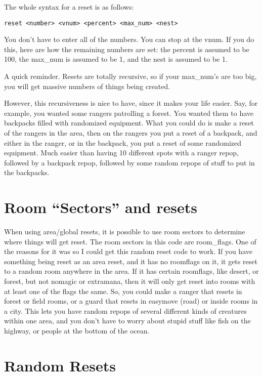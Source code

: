 The whole syntax for a reset is as follows:

\begin{verbatim}
reset <number> <vnum> <percent> <max_num> <nest>
\end{verbatim}

You don't have to enter all of the numbers. You can stop at the
vnum. If you do this, here are how the remaining numbers are set:
 the percent is assumed to be 100, the max\_num
is assumed to be 1, and the nest is assumed to be 1. 

A quick reminder. Resets are totally recursive, so if your max\_num's
are too big, you will get massive numbers of things being created.

However, this recursiveness is nice to have, since it makes your
life easier. Say, for example, you wanted some rangers patrolling
a forest. You wanted them to have backpacks filled with randomized
equipment. What you could do is make a reset of the rangers in
the area, then on the rangers you put a reset of a backpack, and
either in the ranger, or in the backpack, you put a reset of
some randomized equipment. Much easier than having 10 different
spots with a ranger repop, followed by a backpack repop, followed
by some random repops of stuff to put in the backpacks.

\section{Room ``Sectors'' and resets}

When using area/global resets, it is possible to use room sectors to
determine where things will get reset. The room sectors in this
code are room\_flags. One of the reasons for it was so I could
get this random reset code to work. If you have something being
reset as an area reset, and it has no roomflags on it, it gets
reset to a random room anywhere in the area. If it has certain
roomflags, like desert, or forest, but not nomagic or extramana,
then it will only get reset into rooms with at least one of the
flags the same. So, you could make a ranger that resets in forest
or field rooms, or a guard that resets in easymove (road) or inside
rooms in a city. This lets you have random repops of several
different kinds of creatures within one area, and you don't
have to worry about stupid stuff like fish on the highway, or 
people at the bottom of the ocean. 

\section{Random Resets}

